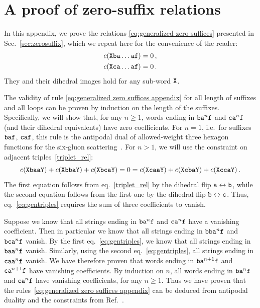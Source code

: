 \documentclass[12pt]{article}
\begin{document}
\section{A proof of zero-suffix relations}\label{app:gzsproof}

In this appendix, we prove the relations \eqref{eq:generalized zero suffices}
presented in Sec.~\ref{sec:zerosuffix}, which we repeat here for the convenience of the reader: 
\begin{equation}
\label{eq:generalized zero suffices appendix}
    \begin{aligned}
        c({\tt X ba\dots af})=0\,,\\
        c({\tt X ca\dots af})=0\,.\\    
    \end{aligned}
\end{equation}
They and their dihedral images hold for any sub-word ${\tt X}$.

The validity of rule \eqref{eq:generalized zero suffices appendix} for all length of suffixes and all loops can be proven by induction on the length of the suffixes. Specifically, we will show that, for any $n\geq 1$, words ending in ${\tt ba}^n{\tt f}$ and ${\tt ca}^n{\tt f}$ (and their dihedral equivalents) have zero coefficients. For $n=1$, i.e.\ for suffixes ${\tt baf}$, ${\tt caf}$, this rule is the antipodal dual of allowed-weight three hexagon functions for the six-gluon scattering~\citep{Dixon:2021tdw}. For $n>1$, we will use the constraint on adjacent triples~\eqref{triplet_rel}:
%
\begin{equation}
c({\tt X baa Y})+c({\tt X bba Y})+c({\tt X bca Y}) = 0 = c({\tt X caa Y})+c({\tt X cba Y})+c({\tt X cca Y}) \,.
\label{eq:gentriples}
\end{equation}
%
The first equation follows from eq.~\eqref{triplet_rel} by the dihedral flip ${\tt a}\leftrightarrow {\tt b}$,
while the second equation follows from the first one by the dihedral flip ${\tt b}\leftrightarrow {\tt c}$.  Thus, eq.~\eqref{eq:gentriples} requires the sum of three coefficients to vanish.

Suppose we know that all strings ending in ${\tt ba}^n{\tt f}$ and ${\tt ca}^n{\tt f}$ have a vanishing coefficient.  Then in particular we know that all strings ending in ${\tt bba}^n{\tt f}$ and ${\tt bca}^n{\tt f}$ vanish.  By the first 
eq.~\eqref{eq:gentriples}, we know that all strings ending in ${\tt baa}^n{\tt f}$ vanish.  Similarly, using the second eq.~\eqref{eq:gentriples}, all strings ending in ${\tt caa}^n{\tt f}$ vanish. We have therefore proven that words ending in ${\tt ba}^{n+1}{\tt f}$ and ${\tt ca}^{n+1}{\tt f}$ have vanishing coefficients. By induction on $n$, all words ending in  ${\tt ba}^n{\tt f}$ and ${\tt ca}^n{\tt f}$ have vanishing coefficients, for any $n\geq 1$. Thus we have proven that the rules~\eqref{eq:generalized zero suffices appendix} can be deduced from antipodal duality \citep{Dixon:2021tdw} and the constraints from Ref.~\citep{Dixon:2022rse}.
\end{document}
